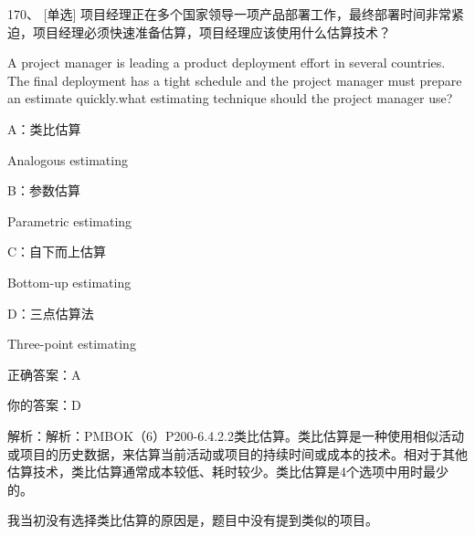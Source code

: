 170、 [单选] 项目经理正在多个国家领导一项产品部署工作，最终部署时间非常紧迫，项目经理必须快速准备估算，项目经理应该使用什么估算技术？

A project manager is leading a product deployment effort in several countries. The final deployment has a tight schedule and the project manager must prepare an estimate quickly.what estimating technique should the project manager use?

A：类比估算

Analogous estimating

B：参数估算

Parametric estimating

C：自下而上估算

Bottom-up estimating

D：三点估算法

Three-point estimating

正确答案：A

你的答案：D

解析：解析：PMBOK（6）P200-6.4.2.2类比估算。类比估算是一种使用相似活动或项目的历史数据，来估算当前活动或项目的持续时间或成本的技术。相对于其他估算技术，类比估算通常成本较低、耗时较少。类比估算是4个选项中用时最少的。

我当初没有选择类比估算的原因是，题目中没有提到类似的项目。